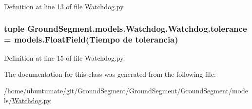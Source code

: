 Definition at line 13 of file Watchdog.\+py.

\hypertarget{class_ground_segment_1_1models_1_1_watchdog_1_1_watchdog_abb2ac1834f5367e279b537108087a4f8}{}
\subsubsection[{tolerance}]{\setlength{\rightskip}{0pt plus 5cm}tuple Ground\+Segment.\+models.\+Watchdog.\+Watchdog.\+tolerance = models.\+Float\+Field(\textquotesingle{}Tiempo de tolerancia\textquotesingle{})\hspace{0.3cm}{\ttfamily [static]}}\label{class_ground_segment_1_1models_1_1_watchdog_1_1_watchdog_abb2ac1834f5367e279b537108087a4f8}


Definition at line 15 of file Watchdog.\+py.



The documentation for this class was generated from the following file\+:\begin{DoxyCompactItemize}
\item 
/home/ubuntumate/git/\+Ground\+Segment/\+Ground\+Segment/\+Ground\+Segment/models/\hyperlink{_watchdog_8py}{Watchdog.\+py}\end{DoxyCompactItemize}
